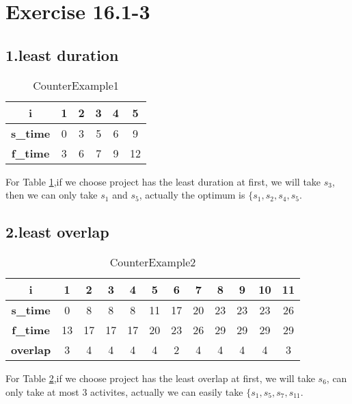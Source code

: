 \documentclass[oneside]{homework} %
\begin{document}
\maketitle
\newpage
\section*{Exercise 16.1-3}
\subsection*{1.least duration}
\begin{table}[h]
  \centering
  \begin{tabular}{|c|c|c|c|c|c|}
	\hline
	\textbf{i} & 1 & 2& 3& 4& 5 \\
	\hline
	\textbf{s\_time} & 0 & 3& 5& 6& 9 \\
	\hline
	\textbf{f\_time} & 3 & 6& 7& 9& 12 \\
	\hline
  \end{tabular}
  \caption{CounterExample1}
  \label{tab:ce1}
\end{table}
For Table \ref{tab:ce1},if we choose project has the least duration at first, we will take $s_{3}$, then we can only take $s_{1}$ and $s_{5}$, actually the optimum is $\{ s_{1},s_{2},s_{4},s_{5}$.
\subsection*{2.least overlap}
\begin{table}[h]
  \centering
  \begin{tabular}{|c|c|c|c|c|c|c|c|c|c|c|c|}
	\hline
	\textbf{i} & 1 & 2& 3& 4& 5& 6& 7& 8& 9& 10& 11\\
	\hline
	\textbf{s\_time} & 0&	8&	8&	8&	11&	17&	20&	23&	23&	23&	26 \\
	\hline
	\textbf{f\_time} & 13&17&	17&	17&	20&	23&	26&	29&	29&	29&	29 \\
	\hline
	\textbf{overlap} & 3 & 4& 4& 4& 4& 2& 4& 4& 4& 4& 3 \\
	\hline
  \end{tabular}
  \caption{CounterExample2}
  \label{tab:ce2}
\end{table}
For Table \ref{tab:ce2},if we choose project has the least overlap at first, we will take $s_{6}$, can only take at most 3 activites, actually we can easily take $\{ s_{1},s_{5},s_{7},s_{11}$.
\end{document}
